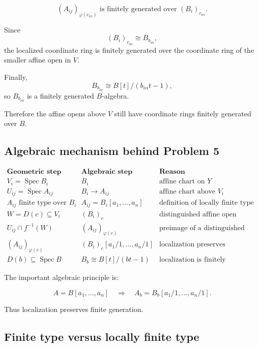 \documentclass[12pt,a4paper]{article}
\theoremstyle{notespace}
\begin{document}
\[
(A_{ij})_{\varphi(c_{i\alpha})}
\text{ is finitely generated over }
(B_i)_{c_{i\alpha}}.
\]

Since
\[
(B_i)_{c_{i\alpha}}\cong B_{b_{i\alpha}},
\]
the localized coordinate ring is finitely generated over the coordinate ring of the smaller affine open in \(V\).

Finally,
\[
B_{b_{i\alpha}}\cong B[t]/(b_{i\alpha}t-1),
\]
so \(B_{b_{i\alpha}}\) is a finitely generated \(B\)-algebra.

Therefore the affine opens above \(V\) still have coordinate rings finitely generated over \(B\).

\subsection{Algebraic mechanism behind Problem 5}

\[
\begin{array}{c|c|c}
	\textbf{Geometric step}
	&
	\textbf{Algebraic step}
	&
	\textbf{Reason}
	\\
	\hline
	V_i=\operatorname{Spec}B_i
	&
	B_i
	&
	\text{affine chart on }Y
	\\[4pt]
	U_{ij}=\operatorname{Spec}A_{ij}
	&
	B_i\to A_{ij}
	&
	\text{affine chart above }V_i
	\\[4pt]
	A_{ij}\text{ finite type over }B_i
	&
	A_{ij}=B_i[a_1,\dots,a_n]
	&
	\text{definition of locally finite type}
	\\[4pt]
	W=D(c)\subseteq V_i
	&
	(B_i)_c
	&
	\text{distinguished affine open}
	\\[4pt]
	U_{ij}\cap f^{-1}(W)
	&
	(A_{ij})_{\varphi(c)}
	&
	\text{preimage of a distinguished open}
	\\[4pt]
	(A_{ij})_{\varphi(c)}
	&
	(B_i)_c[a_1/1,\dots,a_n/1]
	&
	\text{localization preserves generators}
	\\[4pt]
	D(b)\subseteq \operatorname{Spec}B
	&
	B_b\cong B[t]/(bt-1)
	&
	\text{localization is finitely generated}
\end{array}
\]

The important algebraic principle is:

\[
A=B[a_1,\dots,a_n]
\quad\Longrightarrow\quad
A_b=B_b[a_1/1,\dots,a_n/1].
\]

Thus localization preserves finite generation.

\subsection{Finite type versus locally finite type}
\end{document}
